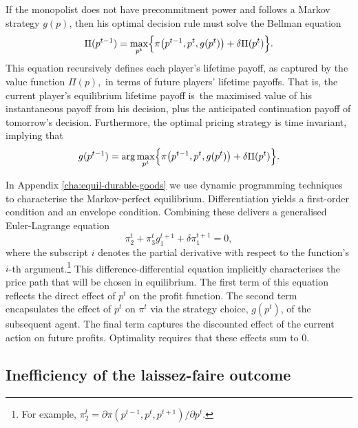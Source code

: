 If the monopolist does not have precommitment power and follows a Markov
strategy $g(p)$, then his optimal decision rule must solve the Bellman
equation 
\begin{equation}
\Pi (p^{t-1})=\max_{p^{t}}\Bigl\{\pi \bigl(p^{t-1},p^{t},g(p^{t})\bigr)%
+\delta \Pi (p^{t})\Bigr\}.  \label{eq:10}
\end{equation}%
This equation recursively defines each player's lifetime payoff, as captured
by the value function $\Pi (p)$,\ in terms of future players' lifetime
payoffs. That is, the current player's equilibrium lifetime payoff is\ the
maximised value of his instantaneous payoff from his decision, plus the
anticipated continuation payoff of tomorrow's decision. Furthermore, the
optimal pricing strategy is time invariant, implying that 
\begin{equation}
g(p^{t-1})=\arg \max_{p^{t}}\Bigl\{\pi \bigl(p^{t-1},p^{t},g(p^{t})\bigr)%
+\delta \Pi (p^{t})\Bigr\}.  \label{eq:11}
\end{equation}

In Appendix \ref{cha:equil-durable-goods} we use dynamic programming
techniques to characterise the Markov-perfect equilibrium. Differentiation
yields a first-order condition and an envelope condition. Combining these
delivers a generalised Euler-Lagrange equation 
\begin{equation}
\pi _{2}^{t}+\pi _{3}^{t}g_{1}^{t+1}+\delta \pi _{1}^{t+1}=0,  \label{eq:12}
\end{equation}%
where the subscript $i$ denotes the partial derivative with respect to the
function's $i$-th argument.\footnote{%
For example, $\pi _{2}^{t}=\partial \pi (p^{t-1},p^{t},p^{t+1})/\partial
p^{t}$.} This difference-differential equation implicitly characterises the
price path that will be chosen in equilibrium. The first term of this
equation reflects the direct effect of $p^{t}$ on the profit function. The
second term encapsulates the effect of $p^{t}$ on $\pi ^{t}$ via the
strategy choice, $g(p^{t})$, of the subsequent agent. The final term
captures the discounted effect of the current action on future profits.
Optimality requires that these effects sum to 0.

\subsection{Inefficiency of the laissez-faire outcome}

\label{sec:need-regulation}

